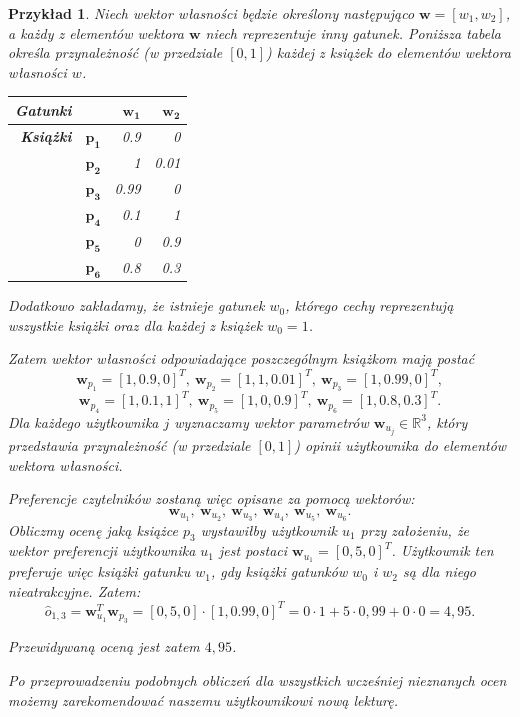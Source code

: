 \documentclass[12pt,a4paper]{report}
\newtheorem{przyklad}{Przykład}[chapter]
\newcommand{\setR}{\mathbb{R}}
\begin{document}
\begin{przyklad}
Niech wektor własności będzie określony następująco $\mathbf{w} = [w_1, w_2]$, a każdy z elementów wektora $\mathbf{w}$ niech reprezentuje inny gatunek. Poniższa tabela określa przynależność (w przedziale $[0,1]$) każdej z książek do elementów wektora własności $w$. 
\begin{center}
\begin{tabular}{|r|r|r|r|} \hline
\textbf{Gatunki} & & $\mathbf{w_1}$ & $\mathbf{w_2}$  \\
\hline
\hline
\textbf{Książki} &$\mathbf{p_1}$ & 0.9 & 0 \\
\hline
&$\mathbf{p_2}$ & 1 & 0.01  \\
\hline
&$\mathbf{p_3}$ & 0.99 & 0 \\
\hline
&$\mathbf{p_4}$ & 0.1 & 1 \\
\hline
&$\mathbf{p_5}$ & 0 & 0.9 \\
\hline
&$\mathbf{p_6}$ & 0.8 & 0.3 \\
\hline
\end{tabular}
\end{center}
Dodatkowo zakładamy, że istnieje gatunek $w_0$, którego cechy reprezentują wszystkie książki oraz dla każdej z książek $w_0=1$.

Zatem wektor własności odpowiadające poszczególnym książkom mają postać
$$
\mathbf{w}_{p_1} = [1, 0.9, 0] ^ T, \: \mathbf{w}_{p_2} = [1, 1, 0.01] ^ T, \: \mathbf{w}_{p_3} = [1, 0.99, 0] ^ T,
$$
$$
\mathbf{w}_{p_4} = [1, 0.1, 1] ^ T, \: \mathbf{w}_{p_5} = [1, 0, 0.9] ^ T, \: \mathbf{w}_{p_6} = [1, 0.8, 0.3] ^ T.
$$
Dla każdego użytkownika $j$ wyznaczamy wektor parametrów $\mathbf{w}_{u_j} \in \setR^3$, który przedstawia przynależność (w przedziale $[0,1]$) opinii użytkownika do elementów wektora własności. 

Preferencje czytelników zostaną więc opisane za pomocą wektorów:
$$
\mathbf{w}_{u_1}, \: \mathbf{w}_{u_2}, \: \mathbf{w}_{u_3}, \: \mathbf{w}_{u_4}, \: \mathbf{w}_{u_5}, \: \mathbf{w}_{u_6}.
$$
Obliczmy ocenę jaką książce $p_3$ wystawiłby użytkownik $u_1$ przy założeniu, że wektor preferencji użytkownika $u_1$ jest postaci $\mathbf{w}_{u_1}= [0,5,0]^T$. Użytkownik ten preferuje więc książki gatunku $w_1$, gdy książki gatunków $w_0$ i $w_2$ są dla niego nieatrakcyjne.
Zatem:
$$
\widehat{o}_{1,3} = \mathbf{w}_{u_1}^T \mathbf{w}_{p_3} = [0,5,0] \cdot [1, 0.99, 0] ^ T = 0 \cdot 1 + 5 \cdot 0,99 + 0 \cdot 0 = 4,95.
$$

Przewidywaną oceną jest zatem $4,95$. 

Po przeprowadzeniu podobnych obliczeń dla wszystkich wcześniej nieznanych ocen możemy zarekomendować naszemu użytkownikowi nową lekturę.
\end{przyklad}
\end{document}
